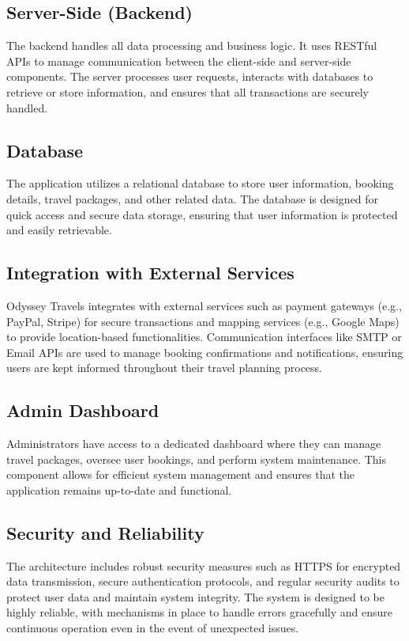 \documentclass{scrreprt}
\begin{document}
\subsection{Server-Side (Backend)}
The backend handles all data processing and business logic. It uses RESTful APIs to manage communication between the client-side and server-side components. The server processes user requests, interacts with databases to retrieve or store information, and ensures that all transactions are securely handled.

\subsection{Database}
The application utilizes a relational database to store user information, booking details, travel packages, and other related data. The database is designed for quick access and secure data storage, ensuring that user information is protected and easily retrievable.

\subsection{Integration with External Services}
Odyssey Travels integrates with external services such as payment gateways (e.g., PayPal, Stripe) for secure transactions and mapping services (e.g., Google Maps) to provide location-based functionalities. Communication interfaces like SMTP or Email APIs are used to manage booking confirmations and notifications, ensuring users are kept informed throughout their travel planning process.

\subsection{Admin Dashboard}
Administrators have access to a dedicated dashboard where they can manage travel packages, oversee user bookings, and perform system maintenance. This component allows for efficient system management and ensures that the application remains up-to-date and functional.

\subsection{Security and Reliability}
The architecture includes robust security measures such as HTTPS for encrypted data transmission, secure authentication protocols, and regular security audits to protect user data and maintain system integrity. The system is designed to be highly reliable, with mechanisms in place to handle errors gracefully and ensure continuous operation even in the event of unexpected issues.
\end{document}
